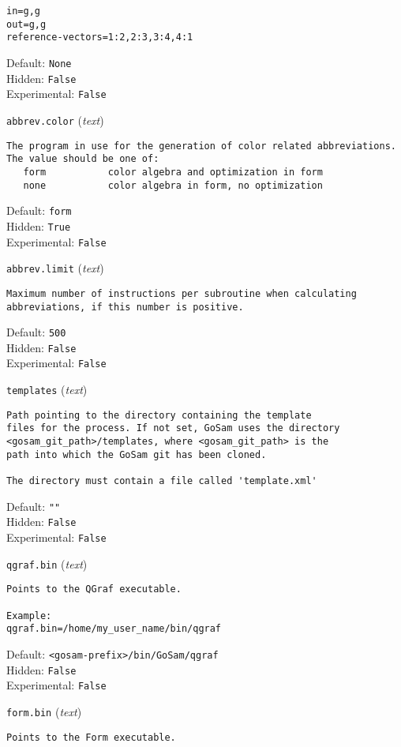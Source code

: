 \begin{basedescript}{\desclabelstyle{\pushlabel}}
\begin{verbatim}
in=g,g
out=g,g
reference-vectors=1:2,2:3,3:4,4:1
\end{verbatim}
Default: \verb|None|
\\Hidden: \verb|False|
\\Experimental: \verb|False|
\\\item[\colorbox{gray!30}{\texttt{abbrev.color}}] (\textit{text})
\begin{verbatim}
The program in use for the generation of color related abbreviations.
The value should be one of:
   form           color algebra and optimization in form
   none           color algebra in form, no optimization
\end{verbatim}
Default: \verb|form|
\\Hidden: \verb|True|
\\Experimental: \verb|False|
\\\item[\colorbox{gray!30}{\texttt{abbrev.limit}}] (\textit{text})
\begin{verbatim}
Maximum number of instructions per subroutine when calculating
abbreviations, if this number is positive.
\end{verbatim}
Default: \verb|500|
\\Hidden: \verb|False|
\\Experimental: \verb|False|
\\\item[\colorbox{gray!30}{\texttt{templates}}] (\textit{text})
\begin{verbatim}
Path pointing to the directory containing the template
files for the process. If not set, GoSam uses the directory
<gosam_git_path>/templates, where <gosam_git_path> is the
path into which the GoSam git has been cloned.

The directory must contain a file called 'template.xml'
\end{verbatim}
Default: \verb|""|
\\Hidden: \verb|False|
\\Experimental: \verb|False|
\\\item[\colorbox{gray!30}{\texttt{qgraf.bin}}] (\textit{text})
\begin{verbatim}
Points to the QGraf executable.

Example:
qgraf.bin=/home/my_user_name/bin/qgraf
\end{verbatim}
Default: \verb|<gosam-prefix>/bin/GoSam/qgraf|
\\Hidden: \verb|False|
\\Experimental: \verb|False|
\\\item[\colorbox{gray!30}{\texttt{form.bin}}] (\textit{text})
\begin{verbatim}
Points to the Form executable.


\end{verbatim}
\end{basedescript}
